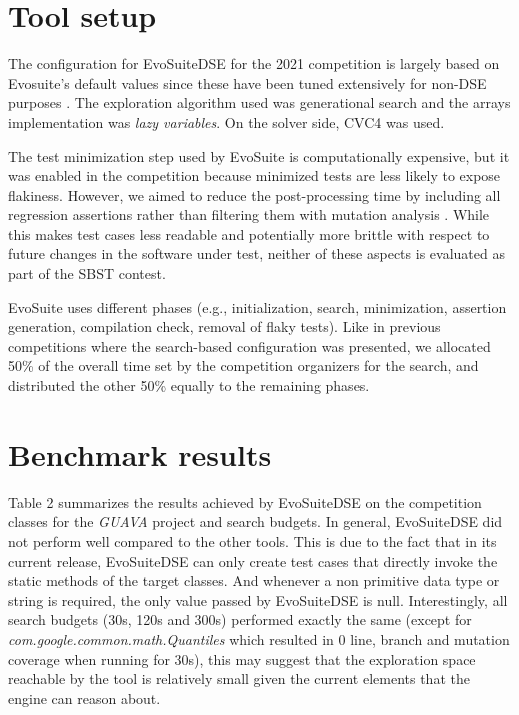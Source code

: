 \documentclass[conference]{IEEEtran}
\begin{document}
\section{Tool setup}

The configuration for EvoSuiteDSE for the 2021 competition is largely based on Evosuite's default values since these have been tuned extensively for non-DSE purposes \cite{tuning}. 
The exploration algorithm used was generational search \cite{SAGE} and the arrays implementation was \textit{lazy variables}. 
On the solver side, CVC4 was used.

The test minimization step used by EvoSuite is computationally expensive, but it was enabled in the competition because minimized tests are less likely to expose flakiness. 
However, we aimed to reduce the post-processing time by including all regression assertions rather than filtering them with mutation analysis \cite{mutationDrivenOracles}. While this makes test cases less readable and potentially more brittle with respect to future changes in the software under test, neither of these aspects is evaluated as part of the SBST contest.

EvoSuite uses different phases (e.g., initialization, search, minimization, assertion generation, compilation check, removal of flaky tests). Like in previous competitions where the search-based configuration was presented, we allocated 50\% of the overall time set by the competition organizers for the search, and distributed the other 50\% equally to the remaining phases.

\section{Benchmark results}
Table 2 summarizes the results achieved by EvoSuiteDSE on the competition classes for the \textit{GUAVA} project and search budgets. In general, EvoSuiteDSE did not perform well compared to the other tools.
This is due to the fact that in its current release, EvoSuiteDSE can only create test cases that directly invoke the static methods of the target classes. 
And whenever a non primitive data type or string is required, the only value passed by EvoSuiteDSE is null.    
Interestingly, all search budgets (30s, 120s and 300s) performed exactly the same (except for \textit{com.google.common.math.Quantiles} which resulted in 0 line, branch and mutation coverage when running for 30s), this may suggest that the exploration space reachable by the tool is relatively small given the current elements that the engine can reason about. 
\end{document}
